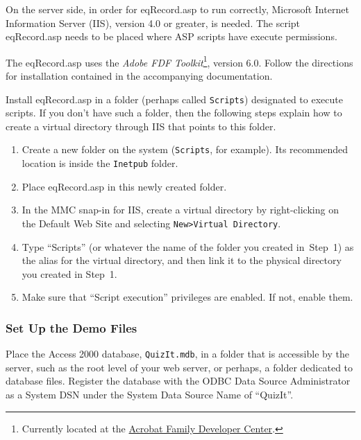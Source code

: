 \documentclass{article}
\begin{document}
On the server side, in order for \textsf{eqRecord.asp} to run
correctly, Microsoft Internet Information Server (IIS), version
4.0 or greater, is needed. The script \textsf{eqRecord.asp} needs to be
placed where ASP scripts have execute permissions.

The \textsf{eqRecord.asp} uses the \textsl{Adobe FDF Toolkit}\footnote{Currently located at the
\href{http://partners.adobe.com/public/developer/acrobat/devcenter.html}{Acrobat Family Developer Center}.}, version
6.0. Follow the directions for installation contained in the
accompanying documentation.

Install \textsf{eqRecord.asp} in a folder (perhaps called
\texttt{Scripts}) designated to execute scripts.  If you don't
have such a folder, then the  following steps explain how to
create a virtual directory through IIS that points to this folder.

\begin{enumerate}
\item Create a new folder on the system (\texttt{Scripts}, for example). Its
recommended location is inside the \texttt{Inetpub} folder.

\item Place \textsf{eqRecord.asp} in this newly created folder.

\item In the MMC snap-in for IIS, create a virtual directory by
right-clicking on the Default Web Site and selecting
\texttt{New\;>\;Virtual Directory}.

\item Type ``Scripts'' (or whatever the name of the folder you
created in~Step~1) as the alias for the virtual directory, and
then link it to the physical directory you created in Step~1.

\item Make sure that ``Script execution'' privileges are enabled.
If not, enable them.
\end{enumerate}

\subsubsection{Set Up the Demo Files}

Place the Access 2000 database, \texttt{QuizIt.mdb}, in a folder
that is accessible by the server, such as the root level of your
web server, or perhaps, a folder dedicated to database files.
Register the database with the ODBC Data Source Administrator as a
System DSN under the System Data Source Name of ``QuizIt''.
\end{document}
